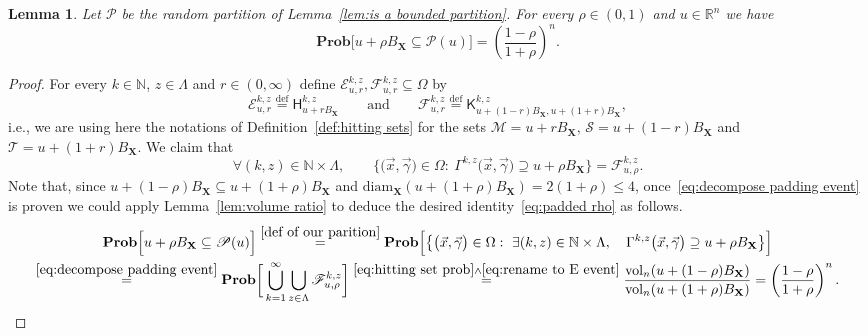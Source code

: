 \documentclass[11pt,reqno]{amsart}
\renewcommand{\le}{\leqslant}
\newcommand{\diam}{\mathrm{diam}}
\newcommand{\X}{\mathbf X}
\newcommand{\R}{\mathbb R}
\newtheorem{lemma}[theorem]{Lemma}
\theoremstyle{remark}
\renewcommand{\supset}{\supseteq}
\renewcommand{\subset}{\subseteq}
\newcommand{\N}{\mathbb N}
\newcommand{\eqdef}{\stackrel{\mathrm{def}}{=}}
\renewcommand{\Pr}{\mathbf{Prob}}
\newcommand{\vol}{\mathrm{vol}}
\renewcommand{\1}{\mathbf 1}
\newcommand{\Part}{\mathscr{P}}
\begin{document}
\begin{lemma}\label{lem:padded rho}
Let $\Part$ be the random partition of Lemma~\ref{lem:is a bounded partition}. For every $\rho\in (0,1)$ and $u\in \R^n$ we have
\begin{equation}\label{eq:padded rho}
 \Pr\Big[u+\rho B_{\X}\subset \Part(u)\Big]= \left(\frac{1-\rho}{1+\rho}\right)^n.
\end{equation}
\end{lemma}


\begin{proof} For every $k\in \N$, $z\in \Lambda$ and $r\in (0,\infty)$ define $\mathscr{E}_{u,r}^{k,z},\mathscr{F}_{u,r}^{k,z}\subset \Omega$ by
\begin{equation}\label{eq:rename to E event}
\mathscr{E}_{u,r}^{k,z}\eqdef \mathsf{H}^{k,z}_{u+rB_{\X}}\qquad\mathrm{and}\qquad \mathscr{F}_{u,r}^{k,z}\eqdef \mathsf{K}^{k,z}_{u+(1-r)B_{\X},u+(1+r)B_{\X}},
\end{equation}
i.e., we are using here the notations of Definition~\ref{def:hitting sets} for the sets  $\mathscr{M}=u+rB_{\X}$, $\mathscr{S}=u+(1-r)B_{\X}$ and $\mathscr{T}=u+(1+r)B_{\X}$. We claim that
\begin{equation}\label{eq:decompose padding event}
\forall (k,z)\in \N\times \Lambda,\qquad \big\{\big(\vec{x},\vec{\gamma}\big)\in \Omega:\  \Gamma^{k,z}\big(\vec{x},\vec{\gamma}\big)\supset u+\rho B_{\X}\big\}= \mathscr{F}_{u,\rho}^{k,z}.
\end{equation}
Note that, since $u+(1-\rho)B_{\X}\subset u+(1+\rho)B_{\X}$ and $\diam_{\X}(u+(1+\rho)B_{\X})=2(1+\rho)\le 4$, once~\eqref{eq:decompose padding event} is proven we could  apply Lemma~\ref{lem:volume ratio} to deduce the desired identity~\eqref{eq:padded rho} as follows.
\begin{multline*}
 \Pr\Big[u+\rho B_{\X}\subset \Part(u)\Big]\stackrel{\eqref{def of our parition}}{=}\Pr\Big[\big\{\big(\vec{x},\vec{\gamma}\big)\in \Omega:\ \exists(k,z)\in \N\times \Lambda,\quad \Gamma^{k,z}\big(\vec{x},\vec{\gamma}\big)\supset u+\rho B_{\X}\big\}\Big]\\
 \stackrel{\eqref{eq:decompose padding event}}{=}\Pr\bigg[\bigcup_{k=1}^\infty\bigcup_{z\in \Lambda}\mathscr{F}_{u,\rho}^{k,z}\bigg]\stackrel{\eqref{eq:hitting set prob}\wedge \eqref{eq:rename to E event}}{=} \frac{\vol_n(u+(1-\rho)B_{\X})}{\vol_n(u+(1+\rho)B_{\X})}
=\left(\frac{1-\rho}{1+\rho}\right)^n.
\end{multline*}




\end{proof}
\end{document}
